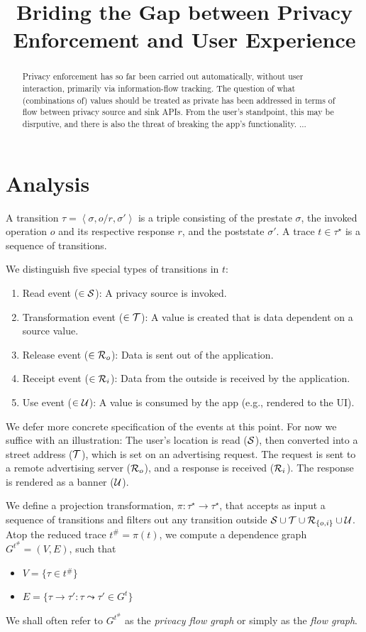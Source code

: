 \documentclass[]{article}
\title{Briding the Gap between Privacy Enforcement and User Experience}
\author{}
\begin{document}
\maketitle

\begin{abstract}
Privacy enforcement has so far been carried out automatically, without user interaction, primarily via information-flow tracking. The question of what (combinations of) values should be treated as private has been addressed in terms of flow between privacy source and sink APIs. From the user's standpoint, this may be disrputive, and there is also the threat of breaking the app's functionality. ...
\end{abstract}

\section{Analysis}

A transition $\tau = \left\langle \sigma,o/r,\sigma'  \right\rangle$ is a triple consisting of the prestate $\sigma$, the invoked operation $o$ and its respective response $r$, and the poststate $\sigma'$. A trace $t \in \tau^{\star}$ is a sequence of transitions.

We distinguish five special types of transitions in $t$:
\begin{enumerate}
	\item Read event ($\in {\cal S}$): A privacy source is invoked.
	\item Transformation event ($\in {\cal T}$): A value is created that is data dependent on a source value.
	\item Release event ($\in {\cal R}_o$): Data is sent out of the application.
	\item Receipt event ($\in {\cal R}_i$): Data from the outside is received by the application.
	\item Use event ($\in {\cal U}$): A value is consumed by the app (e.g., rendered to the UI).
\end{enumerate}
We defer more concrete specification of the events at this point. For now we suffice with an illustration: The user's location is read (${\cal S}$), then converted into a street address (${\cal T}$), which is set on an advertising request. The request is sent to a remote advertising server (${\cal R}_o$), and a response is received (${\cal R}_i$). The response is rendered as a banner (${\cal U}$).

We define a projection transformation, $\pi \colon \tau^{\star} \rightarrow \tau^{\star}$, that accepts as input a sequence of transitions and filters out any transition outside ${\cal S} \cup {\cal T} \cup {\cal R}_{\{ o,i \}} \cup {\cal U}$. Atop the reduced trace $t^{\#} = \pi(t)$, we compute a dependence graph $G^{t^{\#}} = (V,E)$, such that 
\begin{itemize}
	\item $V = \{ \tau \in t^{\#} \}$
	\item $E = \{ \tau \rightarrow \tau' \colon \tau \leadsto \tau' \in G^t \}$
\end{itemize}
We shall often refer to $G^{t^{\#}}$ as the \emph{privacy flow graph} or simply as the \emph{flow graph}.
\end{document}
